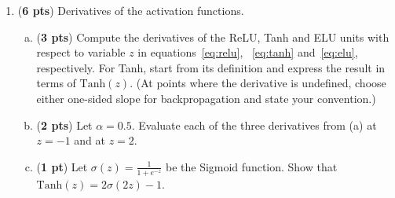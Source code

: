 \documentclass[11pt]{exam}
\begin{document}
\clearpage
\begin{enumerate}[1.]
    \item ({\bf 6 pts}) Derivatives of the activation functions.
    \begin{enumerate}[(a)]
        \item ({\bf 3 pts}) Compute the derivatives of the ReLU, Tanh and ELU units with respect to variable $z$ in equations~\eqref{eq:relu}, ~\eqref{eq:tanh} and~\eqref{eq:elu}, respectively. For Tanh, start from its definition and express the result in terms of $\text{Tanh}(z)$.
        (At points where the derivative is undefined, choose either one-sided slope for backpropagation and state your convention.)
        \begin{tcolorbox}
\vspace{55ex}
\end{tcolorbox}
        \item ({\bf 2 pts}) Let $\alpha = 0.5$. Evaluate each of the three derivatives from (a) at $z = -1$ and at $z = 2$.
        \begin{tcolorbox}
\vspace{55ex}
\end{tcolorbox}
\newpage
        \item ({\bf 1 pt}) Let $\sigma(z) = \frac{1}{1 + e^{-z}}$ be the Sigmoid function. Show that $\text{Tanh}(z) = 2\sigma(2z) - 1$.
        \begin{tcolorbox}
\vspace{55ex}
\end{tcolorbox}
    \end{enumerate}


\end{enumerate}
\end{document}
